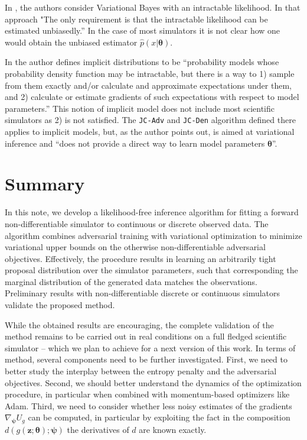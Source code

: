 \documentclass[twocolumn,superscriptaddress,aps]{revtex4-1}
\newcommand{\bftheta}{{\bm \theta}}
\newcommand{\bfpsi}{{\bm \psi}}
\newcommand{\bfz}{\mathbf{z}}
\theoremstyle{plain}
\begin{document}
In \citep{tran2017variational}, the authors consider Variational Bayes with an intractable likelihood. In that approach "The only requirement is that the intractable likelihood can be estimated unbiasedly.'' In the case of most simulators it is not clear how one would obtain the unbiased estimator $\hat{p}(x|\bftheta)$.


In \citep{2017arXiv170208235H} the author defines implicit distributions to be ``probability models whose probability density function may be intractable, but there is a way to 1) sample from them exactly and/or calculate and approximate expectations under them, and 2) calculate or estimate gradients of such expectations with respect to model parameters.'' This notion of implicit model does not include most scientific simulators as 2) is not satisfied. The  \texttt{JC-Adv} and \texttt{JC-Den} algorithm defined there applies to implicit models, but, as the author points out, is aimed at variational inference and ``does not provide a direct way to learn model parameters $\bftheta$''.




\section{Summary}

In this note, we develop a likelihood-free inference algorithm for fitting a
forward non-differentiable simulator to continuous or discrete observed data.
The algorithm combines adversarial training  with variational optimization to
minimize variational upper bounds  on the otherwise non-differentiable
adversarial objectives.
Effectively, the procedure results in learning an arbitrarily tight proposal
distribution over the simulator parameters, such that corresponding the marginal
distribution of the generated data matches the observations. Preliminary results
with non-differentiable discrete or continuous simulators validate the proposed method.

While the obtained results are encouraging, the complete validation of the
method remains to be carried out in real conditions on a full fledged scientific
simulator -- which we plan to achieve for a next version of this work.
In terms of method, several components need to be further investigated.
First, we need to better study the interplay between the entropy penalty and the adversarial objectives.
Second, we should better understand the dynamics of the optimization
procedure, in particular when combined with momentum-based optimizers like Adam.
Third, we need to consider whether less noisy estimates of the gradients
$\nabla_\bfpsi U_g$ can be computed, in particular by exploiting the fact in the composition $d(g(\bfz;\bftheta); \bfpsi)$
the derivatives of $d$ are known exactly.
\end{document}
